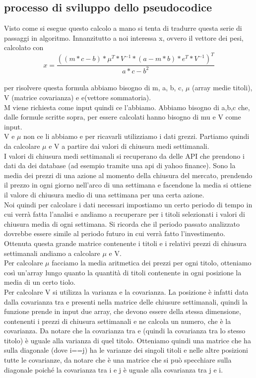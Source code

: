 \subsection{processo di sviluppo dello pseudocodice}
Visto come si esegue questo calcolo a mano si tenta di tradurre questa serie di passaggi in algoritmo.
Innanzitutto a noi interessa x, ovvero il vettore dei pesi, calcolato con\\
\[ x = \frac{((m*c-b) * \mu^T * V^{-1} * (a-m*b)*e^T*V^{-1})^T}{ a*c-b^2 }   
\]\\
\noindent
per risolvere questa formula abbiamo bisogno di m, a, b, c, $\mu$ (array medie titoli), V (matrice covarianza) e e(vettore sommatoria).\\
M viene richiesta come input quindi ce l’abbiamo. Abbiamo bisogno di a,b,c che, dalle formule scritte sopra, per essere calcolati hanno bisogno di mu e V come input.\\
V e $\mu$ non ce li abbiamo e per ricavarli utilizziamo i dati grezzi. Partiamo quindi da calcolare $\mu$ e V a partire dai valori di chiusura medi settimanali. \\
I valori di chiusura medi settimanali si recuperano da delle API che prendono i dati da dei database (ad esempio tramite una api di yahoo finance). Sono la media dei prezzi di una azione al momento della chiusura del mercato, prendendo il prezzo in ogni giorno nell’arco di una settimana e facendone la media si ottiene il valore di chiusura medio di una settimana per una certa azione.\\ 
Noi quindi per calcolare i dati necessari impostiamo un certo periodo di tempo in cui verrà fatta l’analisi e andiamo a recuperare per i titoli selezionati i valori di chiusura media di ogni settimana. Si ricorda che il periodo passato analizzato dovrebbe essere simile al periodo futuro in cui verrà fatto l’investimento.\\

\noindent
Ottenuta questa grande matrice contenente i titoli e i relativi prezzi di chiusura settimanali andiamo a calcolare $\mu$ e V.\\ 
Per calcolare $\mu$ facciamo la media aritmetica dei prezzi per ogni titolo, otteniamo così un’array lungo quanto la quantità di titoli contenente in ogni posizione la media di un certo tiolo. \\
Per calcolare V si utilizza la varianza e la covarianza. La posizione  è infatti data dalla covarianza tra  e  presenti nella matrice delle chiusure settimanali, quindi la funzione  prende in input due array, che devono essere della stessa dimensione, contenenti i prezzi di chiusura settimanali e ne calcola un numero, che è la covarianza. Da notare che la covarianza tra  e  (quindi la covarianza tra lo stesso titolo) è uguale alla varianza di quel titolo. Otteniamo quindi una matrice che ha sulla diagonale (dove i==j) ha le varianze dei singoli titoli e nelle altre posizioni tutte le covarianze, da notare che è una matrice che si può specchiare sulla diagonale poiché la covarianza tra i e j è uguale alla covarianza tra j e i.\\

